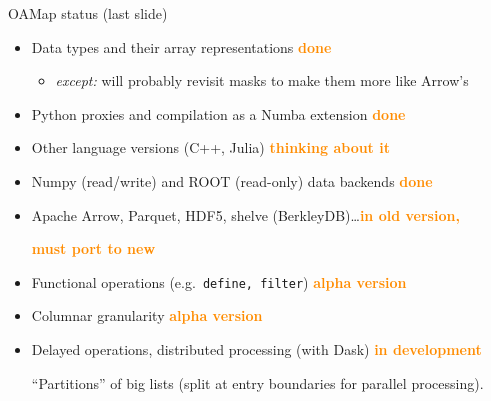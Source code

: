 \documentclass[aspectratio=169]{beamer}
\begin{document}
\begin{frame}{OAMap status (last slide)}
\vspace{0.5 cm}
\large
\begin{itemize}\setlength{\itemsep}{0.25 cm}
\item Data types and their array representations \hfill \textcolor{darkorange}{\bf done\hspace{-0.15 cm}}
\begin{itemize}
\item {\it except:} will probably revisit masks to make them more like Arrow's
\end{itemize}

\item Python proxies and compilation as a Numba extension \hfill \textcolor{darkorange}{\bf done}

\item Other language versions (C++, Julia) \hfill \textcolor{darkorange}{\bf thinking about it}

\item Numpy (read/write) and ROOT (read-only) data backends \hfill \textcolor{darkorange}{\bf done}

\item Apache Arrow, Parquet, HDF5, shelve (BerkleyDB)\ldots \hfill \textcolor{darkorange}{\bf in old version,}

 \hfill \textcolor{darkorange}{\bf must port to new}

\item Functional operations (e.g.\ {\tt\normalsize define, filter}) \hfill \textcolor{darkorange}{\bf alpha version}

\item Columnar granularity \hfill \textcolor{darkorange}{\bf alpha version}

\item Delayed operations, distributed processing (with Dask) \hfill \textcolor{darkorange}{\bf in development}

\vspace{0.15 cm}
``Partitions'' of big lists (split at entry boundaries for parallel processing).
\end{itemize}
\end{frame}
\end{document}
